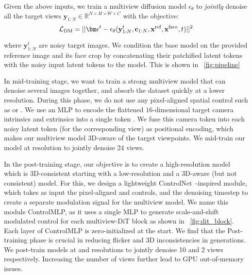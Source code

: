 \vspace{1mm}
 Given the above inputs, we train a multiview diffusion model $\epsilon_\theta$ to \emph{jointly} denoise all the target views $\mathbf{y}_{1:N} \in \mathbb R^{N \times H \times W \times C}$ with the objective: 
\begin{equation}\label{eq:dm_loss2}
    \mathcal{L}_{\mathrm{DM}} = ||\noise^t - \dmmodel(\mathbf{y}^{t}_{1:N}, \mathbf{c}_{1:N}, \mathbf{x}^{\text{ref}}, \mathbf{x}^{\text{face}},  t)||^2
\end{equation}

\noindent where 
$\mathbf{y}^{t}_{1:N}$ are noisy target images. We condition the base model on the provided reference image and its face crop by concatenating their patchified latent tokens with the noisy input latent tokens to the model. This is shown in ~\cref{fig:pipeline}



\vspace{1mm}
 In mid-training stage, we want to train a strong multiview model that can denoise several images together, and absorb the dataset quickly at a lower resolution. During this phase, we do not use any pixel-aligned spatial control such as \plucker or \spatialanchor. We use an MLP to encode the flattened $16$-dimensional target camera intrinsics and extrinsics into a single token 
. We fuse this camera token into each noisy latent token (for the corresponding view) as positional encoding, which makes our multiview model 3D-aware of the target viewpoints. 
We mid-train our model at \resone resolution to jointly denoise 24 views.

\vspace{1mm}
 In the post-training stage, our objective is to create a high-resolution model which is 3D-consistent starting with a low-resolution and a 3D-aware (but not consistent) model. For this, we design a lightweight ControlNet~\cite{zhang2023adding}-inspired module, which takes as input the pixel-aligned \plucker and \spatialanchor controls, and the denoising timestep to create a separate modulation signal for the multiview model. We name this module ControlMLP, as it uses a single MLP to generate scale-and-shift modulated control for each multiview-DiT block as shown in ~\cref{fig:dit_block}. Each layer of ControlMLP is zero-initialized at the start. We find that the Post-training phase is crucial in reducing flicker and 3D inconsistencies in generations. We post-train models at \resthree and \resfour resolutions to jointly denoise 10 and 2 views respectively. Increasing the number of views further lead to GPU out-of-memory issues. 



